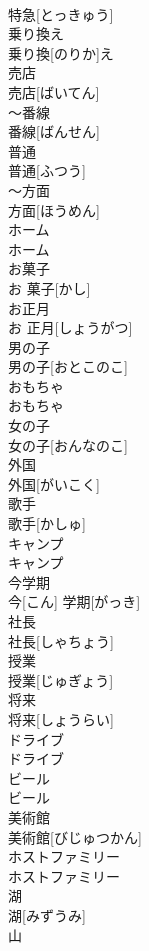 \documentclass[8pt]{extreport}
\begin{document}
\begin{CJK}{UTF8}{min}
\\	特急[とっきゅう]
\\	乗り換え	
\\	乗り換[のりか]え
\\	売店	
\\	売店[ばいてん]
\\	～番線	
\\	番線[ばんせん]
\\	普通	
\\	普通[ふつう]
\\	～方面	
\\	方面[ほうめん]
\\	ホーム	
\\	ホーム
\\	お菓子	
\\	お 菓子[かし]
\\	お正月	
\\	お 正月[しょうがつ]
\\	男の子	
\\	男の子[おとこのこ]
\\	おもちゃ	
\\	おもちゃ
\\	女の子	
\\	女の子[おんなのこ]
\\	外国	
\\	外国[がいこく]
\\	歌手	
\\	歌手[かしゅ]
\\	キャンプ	
\\	キャンプ
\\	今学期	
\\	今[こん] 学期[がっき]
\\	社長	
\\	社長[しゃちょう]
\\	授業	
\\	授業[じゅぎょう]
\\	将来	
\\	将来[しょうらい]
\\	ドライブ	
\\	ドライブ
\\	ビール	
\\	ビール
\\	美術館	
\\	美術館[びじゅつかん]
\\	ホストファミリー	
\\	ホストファミリー
\\	湖	
\\	湖[みずうみ]
\\	山	

\end{CJK}
\end{document}
